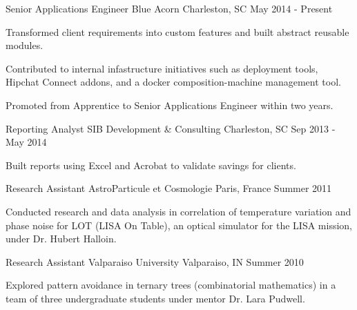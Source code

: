 \begin{cventries}
  \cventry
    {Senior Applications Engineer}
    {Blue Acorn}
    {Charleston, SC}
    {May 2014 - Present}
    {
      \begin{cvitems}
        \item {Transformed client requirements into custom features and built abstract reusable modules.}
        \item {Contributed to internal infastructure initiatives such as deployment tools, Hipchat Connect addons, and a docker composition-machine management tool.}
        \item {Promoted from Apprentice to Senior Applications Engineer within two years.}
      \end{cvitems}
    }
  \cventry
    {Reporting Analyst}
    {SIB Development \& Consulting}
    {Charleston, SC}
    {Sep 2013 - May 2014}
    {
      \begin{cvitems}
        \item {Built reports using Excel and Acrobat to validate savings for clients.}
      \end{cvitems}
    }
  \cventry
    {Research Assistant}
    {AstroParticule et Cosmologie}
    {Paris, France}
    {Summer 2011}
    {
      \begin{cvitems}
        \item {Conducted research and data analysis in correlation of temperature variation and phase noise for LOT (LISA On Table), an optical simulator for the LISA mission, under Dr. Hubert Halloin.}
      \end{cvitems}
    }
  \cventry
    {Research Assistant}
    {Valparaiso University}
    {Valparaiso, IN}
    {Summer 2010}
    {
      \begin{cvitems}
        \item {Explored pattern avoidance in ternary trees (combinatorial mathematics) in a team of three undergraduate students under mentor Dr. Lara Pudwell.}
      \end{cvitems}
    }
\end{cventries}
